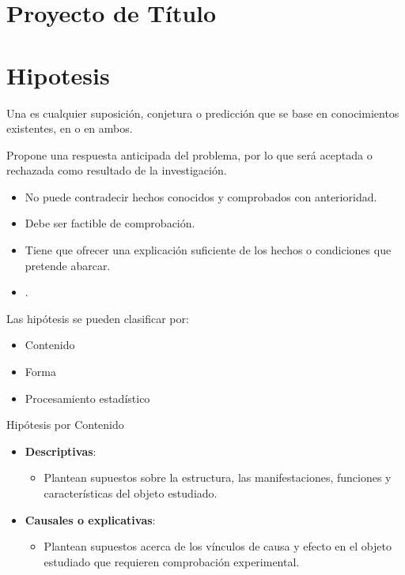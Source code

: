\chapter{Proyecto de Título}
\chapter{Hipotesis}
Una  es cualquier suposición, conjetura o predicción que se base en conocimientos existentes, en  o en ambos.

 Propone una respuesta anticipada del problema, por lo que será aceptada o rechazada como resultado de la investigación.

\begin{itemize}
  \item No puede contradecir hechos conocidos y comprobados con anterioridad.
  \item Debe ser factible de comprobación.
  \item Tiene que ofrecer una explicación suficiente de los hechos o condiciones que pretende abarcar.
  \item {}.
\end{itemize}

Las hipótesis se pueden clasificar por:
 \begin{itemize}
  \item Contenido
  \item Forma
  \item Procesamiento estadístico
\end{itemize}

Hipótesis por Contenido
\begin{itemize}
  \item \textbf{Descriptivas}:
  \begin{itemize}
  \item Plantean supuestos sobre la estructura, las manifestaciones, funciones y características del objeto estudiado.
\end{itemize}

  \item \textbf{Causales o explicativas}:
  \begin{itemize}
  \item Plantean supuestos acerca de los vínculos de causa y efecto en el objeto estudiado que requieren comprobación experimental.
\end{itemize}

\end{itemize}


